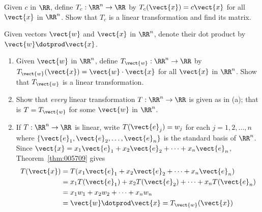 \begin{multicols}{2}
\begin{ex}
Given $c$ in $\RR$, define $T_{c} : \RR^n \to \RR$ by $T_{c}(\vect{x}) = c\vect{x}$ for all $\vect{x}$ in $\RR^n$. Show that $T_{c}$ is a linear transformation and find its matrix.
\end{ex}

\begin{ex}
Given vectors $\vect{w}$ and $\vect{x}$ in $\RR^n$, denote their dot product by $\vect{w} \dotprod \vect{x}$.

\begin{enumerate}[label={\alph*.}]
\item Given $\vect{w}$ in $\RR^n$, define $T_{\vect{w}} : \RR^n \to \RR$ by $T_{\vect{w}}(\vect{x}) = \vect{w} \cdot \vect{x}$ for all $\vect{x}$ in $\RR^n$. Show that $T_{\vect{w}}$ is a linear transformation.

\item Show that \textit{every} linear transformation $T : \RR^n \to \RR$ is given as in (a); that is $T = T_{\vect{w}}$ for some $\vect{w}$ in $\RR^n$.

\end{enumerate}
\begin{sol}
\begin{enumerate}[label={\alph*.}]
\setcounter{enumi}{1}
\item If $T : \RR^n \to \RR$ is linear, write $T(\vect{e}_{j}) = w_{j}$ for each $j = 1, 2, \dots, n$ where $\{\vect{e}_{1}, \vect{e}_{2}, \dots, \vect{e}_{n}\}$ is the standard basis of $\RR^n$. Since $\vect{x} = x_{1}\vect{e}_{1} + x_{2}\vect{e}_{2} + \cdots  + x_{n}\vect{e}_{n}$, Theorem~\ref{thm:005709} gives
\begin{align*}
T(\vect{x}) & = T(x_{1}\vect{e}_{1} + x_{2}\vect{e}_{2} + \cdots + x_{n}\vect{e}_{n}) \\
&= x_{1}T(\vect{e}_{1}) + x_{2}T(\vect{e}_{2}) + \cdots + x_{n}T(\vect{e}_{n}) \\
&= x_{1}w_{1} + x_{2}w_{2} + \cdots + x_{n}w_{n} \\
&= \vect{w} \dotprod \vect{x} = T_{\vect{w}}(\vect{x})
\end{align*}


\end{enumerate}
\end{sol}
\end{ex}
\end{multicols}
